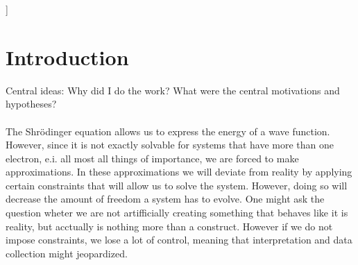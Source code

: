 \documentclass[twoside,twocolumn,9pt]{article}
\begin{document}
  ]

\renewcommand*\rmdefault{bch}\normalfont\upshape
\rmfamily
\section*{}
\vspace{-1cm}










\section{Introduction}

Central ideas: Why did I do the work? What were the central motivations and hypotheses?

\paragraph*{}
The Shrödinger equation allows us to express the energy of a wave function. However, since it is not exactly solvable for systems that 
have more than one electron, e.i. all most all things of importance, we are forced to make approximations. In these approximations we will
deviate from reality by applying certain constraints that will allow us to solve the system. However, doing so will decrease the amount
of freedom a system has to evolve. One might ask the question wheter we are not artifficially creating something that behaves like it is 
reality, but acctually is nothing more than a construct. However if we do not impose constraints, we lose a lot of control, meaning that 
interpretation and data collection might jeopardized. 
\end{document}
